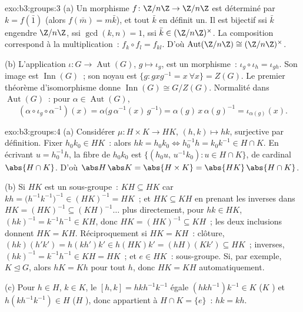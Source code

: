 \begin{solution}{exo:b3:groups:3}
(a) Un morphisme $f \colon \Z/n\Z \to \Z/n\Z$ est déterminé par $k
= f(\bar 1)$ (alors $f(\bar m) = m\bar k$), et tout $\bar k$ en
définit un. Il est bijectif ssi $\bar k$ engendre $\Z/n\Z$, ssi
$\gcd(k,n) = 1$, ssi $\bar k \in (\Z/n\Z)^\times$. La composition
correspond à la multiplication~: $f_k \circ f_l = f_{kl}$. D'où
$\operatorname{Aut}(\Z/n\Z) \cong (\Z/n\Z)^\times$.

(b) L'application $\iota\colon G \to \operatorname{Aut}(G)$, $g
\mapsto \iota_g$, est un morphisme~: $\iota_g \circ \iota_h =
\iota_{gh}$. Son image est $\operatorname{Inn}(G)$~; son noyau
est $\{g : gxg^{-1} = x\ \forall x\} = Z(G)$. Le premier théorème
d'isomorphisme donne $\operatorname{Inn}(G) \cong G/Z(G)$.
Normalité dans $\operatorname{Aut}(G)$~: pour $\alpha \in
\operatorname{Aut}(G)$,
\[
(\alpha \circ \iota_g \circ \alpha^{-1})(x)
= \alpha\bigl(g\,\alpha^{-1}(x)\,g^{-1}\bigr)
= \alpha(g)\, x\, \alpha(g)^{-1} = \iota_{\alpha(g)}(x).
\]
\end{solution}

\begin{solution}{exo:b3:groups:4}
(a) Considérer $\mu \colon H \times K \to HK$, $(h,k) \mapsto
hk$, surjective par définition. Fixer $h_0k_0 \in HK$~: alors $hk
= h_0k_0 \iff h_0^{-1}h = k_0 k^{-1} \in H \cap K$. En écrivant
$u = h_0^{-1}h$, la fibre de $h_0k_0$ est $\{(h_0u,\,
u^{-1}k_0) : u \in H \cap K\}$, de cardinal $\abs{H \cap K}$.
D'où $\abs H\,\abs K = \abs{H\times K} = \abs{HK}\,\abs{H \cap
K}$.

(b) Si $HK$ est un sous-groupe~: $KH \subseteq HK$ car $kh =
\bigl(h^{-1}k^{-1}\bigr)^{-1} \in (HK)^{-1} = HK$~; et $HK
\subseteq KH$ en prenant les inverses dans $HK = (HK)^{-1}
\subseteq (KH)^{-1}\dots$ plus directement, pour $hk \in HK$,
$(hk)^{-1} = k^{-1}h^{-1} \in KH$, donc $HK = (HK)^{-1}
\subseteq KH$~; les deux inclusions donnent $HK = KH$.
Réciproquement si $HK = KH$~: clôture, $(hk)(h'k') = h(kh')k'
\in h(HK)k' = (hH)(Kk') \subseteq HK$~; inverses, $(hk)^{-1} =
k^{-1}h^{-1} \in KH = HK$~; et $e \in HK$~: sous-groupe. Si, par
exemple, $K \trianglelefteq G$, alors $hK = Kh$ pour tout $h$,
donc $HK = KH$ automatiquement.

(c) Pour $h \in H$, $k \in K$, le  $[h,k] =
hkh^{-1}k^{-1}$ égale $(hkh^{-1})k^{-1} \in K$ ($K$ ) et
$h(kh^{-1}k^{-1}) \in H$ ($H$ ), donc appartient à $H \cap
K = \{e\}$~: $hk = kh$.
\end{solution}

